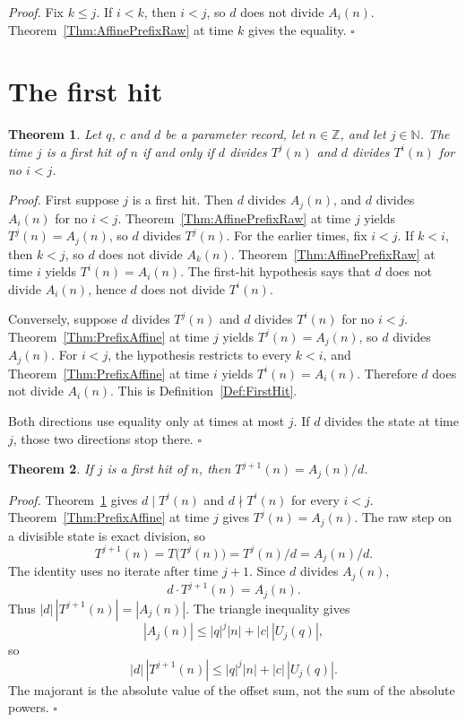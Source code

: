 \documentclass[11pt,letterpaper]{article}
\newcommand{\N}{\mathbb{N}}
\newcommand{\Z}{\mathbb{Z}}
\newtheorem{theorem}{Theorem}
\newenvironment{proof}{\noindent\textit{Proof.}}{\hfill\(\square\)}
\begin{document}
\begin{proof}
Fix \(k\le j\). If \(i<k\), then \(i<j\), so \(d\) does not divide \(A_{i}(n)\). Theorem~\ref{Thm:AffinePrefixRaw} at time \(k\) gives the equality.
\end{proof}

\section{The first hit}

\begin{theorem}\label{Thm:FirstHit}
Let \(q\), \(c\) and \(d\) be a parameter record, let \(n\in\Z\), and let \(j\in\N\). The time \(j\) is a first hit of \(n\) if and only if \(d\) divides \(T^{j}(n)\) and \(d\) divides \(T^{i}(n)\) for no \(i<j\).
\end{theorem}

\begin{proof}
First suppose \(j\) is a first hit. Then \(d\) divides \(A_{j}(n)\), and \(d\) divides \(A_{i}(n)\) for no \(i<j\). Theorem~\ref{Thm:AffinePrefixRaw} at time \(j\) yields \(T^{j}(n)=A_{j}(n)\), so \(d\) divides \(T^{j}(n)\). For the earlier times, fix \(i<j\). If \(k<i\), then \(k<j\), so \(d\) does not divide \(A_{k}(n)\). Theorem~\ref{Thm:AffinePrefixRaw} at time \(i\) yields \(T^{i}(n)=A_{i}(n)\). The first-hit hypothesis says that \(d\) does not divide \(A_{i}(n)\), hence \(d\) does not divide \(T^{i}(n)\).

Conversely, suppose \(d\) divides \(T^{j}(n)\) and \(d\) divides \(T^{i}(n)\) for no \(i<j\). Theorem~\ref{Thm:PrefixAffine} at time \(j\) yields \(T^{j}(n)=A_{j}(n)\), so \(d\) divides \(A_{j}(n)\). For \(i<j\), the hypothesis restricts to every \(k<i\), and Theorem~\ref{Thm:PrefixAffine} at time \(i\) yields \(T^{i}(n)=A_{i}(n)\). Therefore \(d\) does not divide \(A_{i}(n)\). This is Definition~\ref{Def:FirstHit}.

Both directions use equality only at times at most \(j\). If \(d\) divides the state at time \(j\), those two directions stop there.
\end{proof}

\begin{theorem}\label{Thm:FirstHitQuotient}
If \(j\) is a first hit of \(n\), then \(T^{j+1}(n)=A_{j}(n)/d\).
\end{theorem}

\begin{proof}
Theorem~\ref{Thm:FirstHit} gives \(d\mid T^{j}(n)\) and \(d\nmid T^{i}(n)\) for every \(i<j\). Theorem~\ref{Thm:PrefixAffine} at time \(j\) gives \(T^{j}(n)=A_{j}(n)\). The raw step on a divisible state is exact division, so
\[
T^{j+1}(n)=T\bigl(T^{j}(n)\bigr)=T^{j}(n)/d=A_{j}(n)/d.
\]
The identity uses no iterate after time \(j+1\). Since \(d\) divides \(A_{j}(n)\),
\[
d\cdot T^{j+1}(n)=A_{j}(n).
\]
Thus \(|d|\,|T^{j+1}(n)|=|A_{j}(n)|\). The triangle inequality gives
\[
|A_{j}(n)|\le |q|^{j}|n|+|c|\,|U_{j}(q)|,
\]
so
\[
|d|\,|T^{j+1}(n)|\le |q|^{j}|n|+|c|\,|U_{j}(q)|.
\]
The majorant is the absolute value of the offset sum, not the sum of the absolute powers.
\end{proof}
\end{document}
